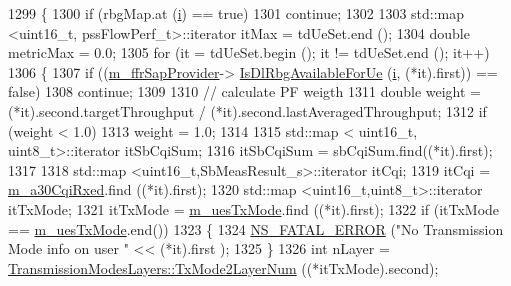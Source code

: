 \begin{DoxyCode}
1299                 \{
1300                   \textcolor{keywordflow}{if} (rbgMap.at (\hyperlink{bernuolliDistribution_8m_a6f6ccfcf58b31cb6412107d9d5281426}{i}) == \textcolor{keyword}{true})
1301                     \textcolor{keywordflow}{continue};
1302 
1303                   std::map <uint16\_t, pssFlowPerf\_t>::iterator itMax = tdUeSet.end ();
1304                   \textcolor{keywordtype}{double} metricMax = 0.0;
1305                   \textcolor{keywordflow}{for} (it = tdUeSet.begin (); it != tdUeSet.end (); it++)
1306                     \{
1307                       \textcolor{keywordflow}{if} ((\hyperlink{classns3_1_1PssFfMacScheduler_a8b7889293dd002f806e2d6afd9c50aed}{m\_ffrSapProvider}->
      \hyperlink{classns3_1_1LteFfrSapProvider_a91f4de3c794d2a32fae5bcfafd88b6fa}{IsDlRbgAvailableForUe} (\hyperlink{bernuolliDistribution_8m_a6f6ccfcf58b31cb6412107d9d5281426}{i}, (*it).first)) == \textcolor{keyword}{false})
1308                         \textcolor{keywordflow}{continue};
1309 
1310                       \textcolor{comment}{// calculate PF weigth }
1311                       \textcolor{keywordtype}{double} weight = (*it).second.targetThroughput / (*it).second.lastAveragedThroughput;
1312                       \textcolor{keywordflow}{if} (weight < 1.0)
1313                         weight = 1.0;
1314         
1315                       std::map < uint16\_t, uint8\_t>::iterator itSbCqiSum;
1316                       itSbCqiSum = sbCqiSum.find((*it).first);
1317         
1318                       std::map <uint16\_t,SbMeasResult\_s>::iterator itCqi;
1319                       itCqi = \hyperlink{classns3_1_1PssFfMacScheduler_ab1bc511b7c55ead9b2e8ff1e0d4b0e3b}{m\_a30CqiRxed}.find ((*it).first);
1320                       std::map <uint16\_t,uint8\_t>::iterator itTxMode;
1321                       itTxMode = \hyperlink{classns3_1_1PssFfMacScheduler_a48aa1d9dc22e9c73e3c2206be76bb6cd}{m\_uesTxMode}.find ((*it).first);
1322                       \textcolor{keywordflow}{if} (itTxMode == \hyperlink{classns3_1_1PssFfMacScheduler_a48aa1d9dc22e9c73e3c2206be76bb6cd}{m\_uesTxMode}.end())
1323                         \{
1324                           \hyperlink{group__fatal_ga5131d5e3f75d7d4cbfd706ac456fdc85}{NS\_FATAL\_ERROR} (\textcolor{stringliteral}{"No Transmission Mode info on user "} << (*it).first
      );
1325                         \}
1326                       \textcolor{keywordtype}{int} nLayer = \hyperlink{classns3_1_1TransmissionModesLayers_a31f608b7bfaa77440fe4cb85ad035329}{TransmissionModesLayers::TxMode2LayerNum}
       ((*itTxMode).second);

\end{DoxyCode}
